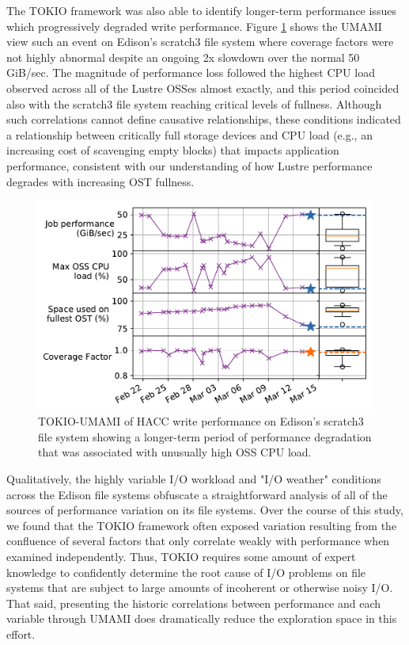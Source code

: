 The TOKIO framework was also able to identify longer-term performance issues which progressively degraded write performance. Figure \ref{fig:umami-scratch3-hacc-write-long-term} shows the UMAMI view such an event on Edison's scratch3 file system where coverage factors were not highly abnormal despite an ongoing 2x slowdown over the normal 50 GiB/sec.  The magnitude of performance loss followed the highest CPU load observed across all of the Lustre OSSes almost exactly, and this period coincided also with the scratch3 file system reaching critical levels of fullness.  Although such correlations cannot define causative relationships, these conditions indicated a relationship between critically full storage devices and CPU load (e.g., an increasing cost of scavenging empty blocks) that impacts application performance, consistent with our understanding of how Lustre performance degrades with increasing OST fullness.

\begin{figure}[t]
    \centering
    \includegraphics[width=1.0\columnwidth]{figs/umami-scratch3-hacc-write-long-term.pdf}
    \caption{TOKIO-UMAMI of HACC write performance on Edison's scratch3 file system showing a longer-term period of performance degradation that was associated with unusually high OSS CPU load.}
    \label{fig:umami-scratch3-hacc-write-long-term}
\end{figure}

Qualitatively, the highly variable I/O workload and "I/O weather" conditions across the Edison file systems obfuscate a straightforward analysis of all of the sources of performance variation on its file systems.
Over the course of this study, we found that the TOKIO framework often exposed variation resulting from the confluence of several factors that only correlate weakly with performance when examined independently.
Thus, TOKIO requires some amount of expert knowledge to confidently determine the root cause of I/O problems on file systems that are subject to large amounts of incoherent or otherwise noisy I/O.
That said, presenting the historic correlations between performance and each variable through UMAMI does dramatically reduce the exploration space in this effort.

